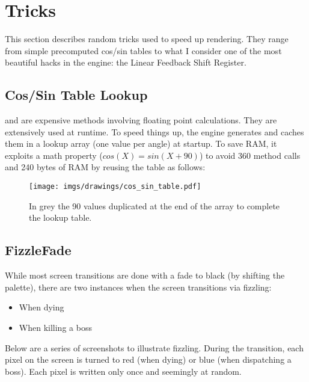 \section{Tricks}

This section describes random tricks used to speed up rendering. They range from simple precomputed cos/sin tables to what I consider one of the most beautiful hacks in the engine: the Linear Feedback Shift Register.




\subsection{Cos/Sin Table Lookup}
 and  are expensive methods involving floating point calculations. They are extensively used at runtime. To speed things up, the engine generates and caches them in a lookup array (one value per angle) at startup. To save RAM, it exploits a math property ($cos(X) = sin(X + 90)$) to avoid 360  method calls and 240 bytes of RAM by reusing the  table as follows:\\
\par
\label{cossintable}
\begin{minipage}{\textwidth}

\end{minipage}


\begin{figure}[H]
 \centering
  \texttt{[image: imgs/drawings/cos\_sin\_table.pdf]}
  \caption{In grey the 90  values duplicated at the end of the array to complete the  lookup table.}
\end{figure}








\subsection{FizzleFade}
While most screen transitions are done with a fade to black (by shifting the palette), there are two instances when the screen transitions via fizzling:
\begin{itemize}
	\item When dying
	\item When killing a boss
\end{itemize}
Below are a series of screenshots to illustrate fizzling. During the transition, each pixel on the screen is turned to red (when dying) or blue (when dispatching a boss). Each pixel is written only once and seemingly at random. 



